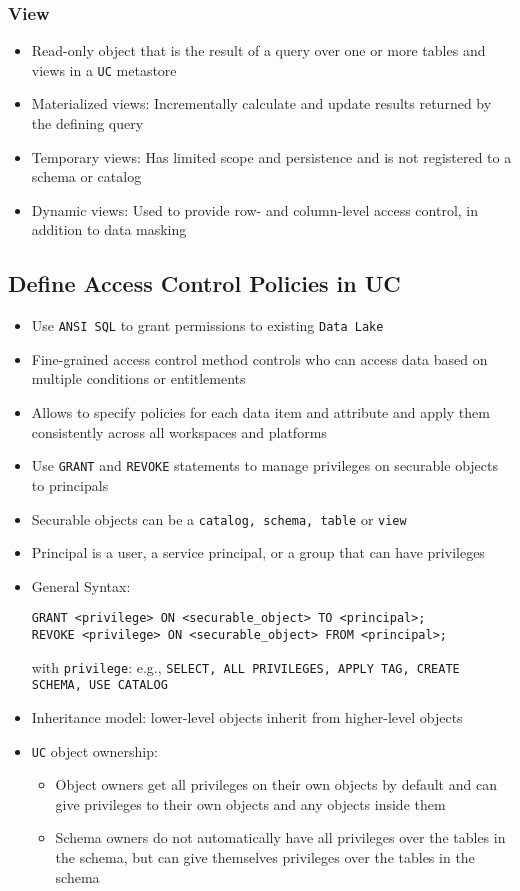 \documentclass[11pt]{scrartcl}
\begin{document}
\subsubsection{View} \label{view}
\begin{itemize}
	\item Read-only object that is the result of a query over one or more tables and views in a \texttt{UC} metastore
	\item Materialized views: Incrementally calculate and update results returned by the defining query
	\item Temporary views: Has limited scope and persistence and is not registered to a schema or catalog
	\item Dynamic views: Used to provide row- and column-level access control, in addition to data masking
\end{itemize}


\subsection{Define Access Control Policies in UC}
\begin{itemize}
	\item Use \texttt{ANSI SQL} to grant permissions to existing \texttt{Data Lake}
	\item Fine-grained access control method controls who can access data based on multiple conditions or entitlements
	\item Allows to specify policies for each data item and attribute and apply them consistently across all workspaces and platforms
	\item Use \texttt{GRANT} and \texttt{REVOKE} statements to manage privileges on securable objects to principals
	\item Securable objects can be a \texttt{catalog, schema, table} or \texttt{view}
	\item Principal is a user, a service principal, or a group that can have privileges
	\item General Syntax:
\begin{lstlisting}
GRANT <privilege> ON <securable_object> TO <principal>;
REVOKE <privilege> ON <securable_object> FROM <principal>;
\end{lstlisting}
	with \texttt{privilege}: e.g., \texttt{SELECT, ALL PRIVILEGES, APPLY TAG, CREATE SCHEMA, USE CATALOG}
	\item Inheritance model: lower-level objects inherit from higher-level objects 
	\item \texttt{UC} object ownership:
	\begin{itemize}
		\item Object owners get all privileges on their own objects by default and can give privileges to their own objects and any objects inside them
		\item Schema owners do not automatically have all privileges over the tables in the schema, but can give themselves privileges over the tables in the schema
	\end{itemize}
\end{itemize}
\end{document}
